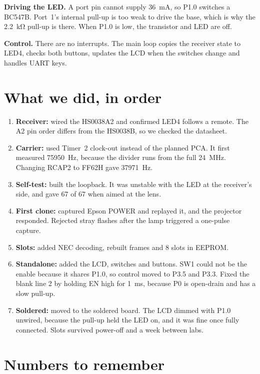 \documentclass[11pt,a4paper]{article}
\begin{document}
\textbf{Driving the LED.} A port pin cannot supply \qty{36}{\milli\ampere}, so P1.0 switches a BC547B. Port~1's internal pull-up is too weak to drive the base, which is why the \qty{2.2}{\kilo\ohm} pull-up is there. When P1.0 is low, the transistor and LED are off.

\textbf{Control.} There are no interrupts. The main loop copies the receiver state to LED4, checks both buttons, updates the LCD when the switches change and handles UART keys.

\section{What we did, in order}

\begin{enumerate}
\item \textbf{Receiver:} wired the HS0038A2 and confirmed LED4 follows a remote. The A2 pin order differs from the HS0038B, so we checked the datasheet.
\item \textbf{Carrier:} used Timer~2 clock-out instead of the planned PCA. It first measured \qty{75950}{\hertz}, because the divider runs from the full \qty{24}{\mega\hertz}. Changing RCAP2 to FF62H gave \qty{37971}{\hertz}.
\item \textbf{Self-test:} built the loopback. It was unstable with the LED at the receiver's side, and gave 67 of 67 when aimed at the lens.
\item \textbf{First clone:} captured Epson POWER and replayed it, and the projector responded. Rejected stray flashes after the lamp triggered a one-pulse capture.
\item \textbf{Slots:} added NEC decoding, rebuilt frames and 8 slots in EEPROM.
\item \textbf{Standalone:} added the LCD, switches and buttons. SW1 could not be the enable because it shares P1.0, so control moved to P3.5 and P3.3. Fixed the blank line 2 by holding EN high for \qty{1}{\milli\second}, because P0 is open-drain and has a slow pull-up.
\item \textbf{Soldered:} moved to the soldered board. The LCD dimmed with P1.0 unwired, because the pull-up held the LED on, and it was fine once fully connected. Slots survived power-off and a week between labs.
\end{enumerate}

\section{Numbers to remember}
\end{document}
